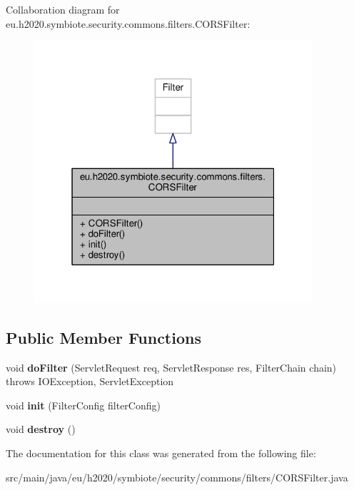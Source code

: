 Collaboration diagram for eu.\+h2020.\+symbiote.\+security.\+commons.\+filters.\+C\+O\+R\+S\+Filter\+:
\nopagebreak
\begin{figure}[H]
\begin{center}
\leavevmode
\includegraphics[width=292pt]{classeu_1_1h2020_1_1symbiote_1_1security_1_1commons_1_1filters_1_1CORSFilter__coll__graph}
\end{center}
\end{figure}
\subsection*{Public Member Functions}
\begin{DoxyCompactItemize}
\item 
void {\bfseries do\+Filter} (Servlet\+Request req, Servlet\+Response res, Filter\+Chain chain)  throws I\+O\+Exception, Servlet\+Exception \hypertarget{classeu_1_1h2020_1_1symbiote_1_1security_1_1commons_1_1filters_1_1CORSFilter_acc7cf17f670b1190ba0331899938c05e}{}\label{classeu_1_1h2020_1_1symbiote_1_1security_1_1commons_1_1filters_1_1CORSFilter_acc7cf17f670b1190ba0331899938c05e}

\item 
void {\bfseries init} (Filter\+Config filter\+Config)\hypertarget{classeu_1_1h2020_1_1symbiote_1_1security_1_1commons_1_1filters_1_1CORSFilter_ae2c300d63712bcb26e3a3f8fc07795e5}{}\label{classeu_1_1h2020_1_1symbiote_1_1security_1_1commons_1_1filters_1_1CORSFilter_ae2c300d63712bcb26e3a3f8fc07795e5}

\item 
void {\bfseries destroy} ()\hypertarget{classeu_1_1h2020_1_1symbiote_1_1security_1_1commons_1_1filters_1_1CORSFilter_aca378a9022997b996a9b886a5a4d549f}{}\label{classeu_1_1h2020_1_1symbiote_1_1security_1_1commons_1_1filters_1_1CORSFilter_aca378a9022997b996a9b886a5a4d549f}

\end{DoxyCompactItemize}


The documentation for this class was generated from the following file\+:\begin{DoxyCompactItemize}
\item 
src/main/java/eu/h2020/symbiote/security/commons/filters/C\+O\+R\+S\+Filter.\+java\end{DoxyCompactItemize}
